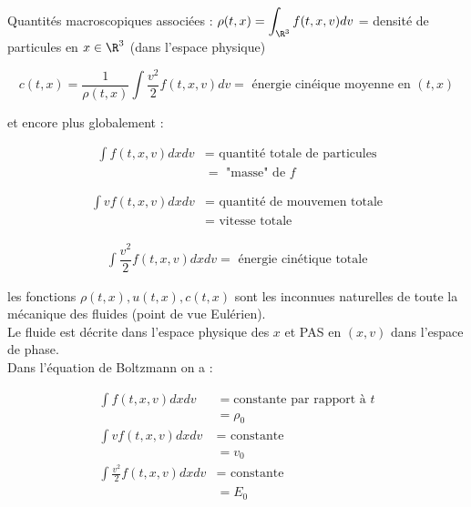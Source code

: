 \documentclass[12pt,a4paper]{article}
\begin{document}
	Quantités macroscopiques associées : $\rho(t,x) = \displaystyle\int_{\R^3} f(t,x,v) dv$ = densité de particules en $x \in \R^3$ (dans l'espace physique)
	
	\[
	c(t,x) = \dfrac1{\rho(t,x)}\displaystyle\int \dfrac{v^2}2 f(t,x,v)dv = \text{ énergie cinéique moyenne en } (t,x)
	\]
	
	et encore plus globalement :
	
	\[
	\begin{aligned}
		\displaystyle\int f(t,x,v) dxdv 
		&= \text{ quantité totale de particules}\\
		&= \text{ "masse" de }f
	\end{aligned}
	\]
	
	\[
	\begin{aligned}
		\displaystyle\int vf(t,x,v)dxdv 
		&= \text{ quantité de mouvemen totale}\\
		&= \text{ vitesse totale}
	\end{aligned}
	\]
	
	\[
	\begin{aligned}
		\displaystyle\int \dfrac{v^2}2 f(t,x,v) dxdv = \text{ énergie cinétique totale}
	\end{aligned}
	\]
	
	 les fonctions $\rho(t,x), u(t,x), c(t,x)$ sont les inconnues naturelles de toute la mécanique des fluides (point de vue Eulérien).\\
	
	\fbox{!} Le fluide est décrite dans l'espace physique des $x$ et PAS en $(x,v)$ dans l'espace de phase.\\
	
	 Dans l'équation de Boltzmann on a :
	
	\[
	\begin{aligned}
		\displaystyle\int f(t,x,v) dxdv 
		&= \text{constante par rapport à } t\\
		&= \rho_0\\
		\int vf(t,x,v)dxdv 
		&= \text{ constante } \\
		&= v_0 \\
		\int \frac{v^2}2 f(t,x,v) dxdv 
		&= \text{ constante}\\
		&=E_0
	\end{aligned}
	\]
	
	\newpage
	
\end{document}
